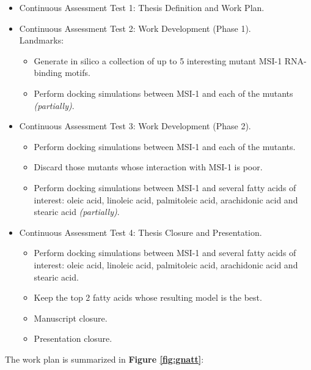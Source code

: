 \begin{itemize}
    \item Continuous Assessment Test 1: Thesis Definition and Work Plan.
    \item Continuous Assessment Test 2: Work Development (Phase 1).\\
        Landmarks:
        \begin{itemize}
            \item Generate in silico a collection of up to 5 interesting mutant MSI-1 RNA-binding motifs.
            \item Perform docking simulations between MSI-1 and each of the mutants {\color{red}\textit{(partially)}}.
        \end{itemize}
    \item Continuous Assessment Test 3: Work Development (Phase 2).
        \begin{itemize}
            \item Perform docking simulations between MSI-1 and each of the mutants.
            \item Discard those mutants whose interaction with MSI-1 is poor.
            \item Perform docking simulations between MSI-1 and several fatty acids of interest: oleic acid, linoleic acid, palmitoleic acid, arachidonic acid and stearic acid {\color{red}\textit{(partially)}}.
        \end{itemize}
    \item Continuous Assessment Test 4: Thesis Closure and Presentation.
        \begin{itemize}
            \item Perform docking simulations between MSI-1 and several fatty acids of interest: oleic acid, linoleic acid, palmitoleic acid, arachidonic acid and stearic acid.
            \item Keep the top 2 fatty acids whose resulting model is the best.
            \item Manuscript closure.
            \item Presentation closure.
        \end{itemize}
\end{itemize}

\pagebreak

The work plan is summarized in \textbf{Figure \ref{fig:gnatt}}:


